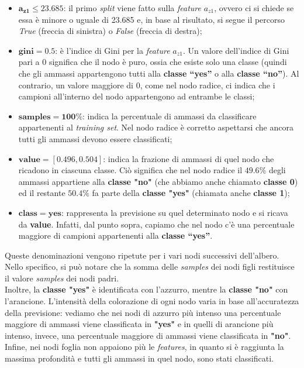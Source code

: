 \begin{itemize}
    \item $\mathbf{a_{z1} \le 23.685}$: il primo \textit{split} viene fatto sulla \textit{feature} $a_{z1}$, ovvero ci si chiede se essa è minore o uguale di 23.685 e, in base al risultato, si segue il percorso \textit{True} (freccia di sinistra) o \textit{False} (freccia di destra);
    \item $\mathbf{gini = 0.5}$: è l'indice di Gini per la \textit{feature} $a_{z1}$. Un valore dell'indice di Gini pari a 0 significa che il nodo è puro, ossia che esiste solo una classe (quindi che gli ammassi appartengono tutti alla \textbf{classe “yes”} o alla \textbf{classe “no”}). Al contrario, un valore maggiore di 0, come nel nodo radice, ci indica che i campioni all’interno del nodo appartengono ad entrambe le classi; 
    \item $\mathbf{samples = 100\%}$: indica la percentuale di ammassi da classificare appartenenti al \textit{training set}. Nel nodo radice è corretto aspettarsi che ancora tutti gli ammassi devono essere classificati;
    \item $\mathbf{value = [0.496, 0.504]}$: indica la frazione di ammassi di quel nodo che ricadono in ciascuna classe. Ciò significa che nel nodo radice il $49.6\%$ degli ammassi appartiene alla \textbf{classe "no"} (che abbiamo anche chiamato \textbf{classe 0}) ed il restante $50.4\%$ fa parte della \textbf{classe "yes"} (chiamata anche \textbf{classe 1});
    \item $\mathbf{class = yes}$: rappresenta la previsione su quel determinato nodo e si ricava da \textbf{value}. Infatti, dal punto sopra, capiamo che nel nodo c'è una percentuale maggiore di campioni appartenenti alla \textbf{classe “yes”}.
\end{itemize}
Queste denominazioni vengono ripetute per i vari nodi successivi dell’albero. Nello specifico, si può notare che la somma delle \textit{samples} dei nodi figli restituisce il valore \textit{samples} dei nodi padri.\\
Inoltre, la \textbf{classe "yes"} è identificata con l'azzurro, mentre la \textbf{classe "no"} con l'arancione. L'intensità della colorazione di ogni nodo varia in base all'accuratezza della previsione: vediamo che nei nodi di azzurro più intenso una percentuale maggiore di ammassi viene classificata in \textbf{"yes"} e in quelli di arancione più intenso, invece, una percentuale maggiore di ammassi viene classificata in \textbf{"no"}.\\
Infine, nei nodi foglia non appaiono più le \textit{features}, in quanto si è raggiunta la massima profondità e tutti gli ammassi in quel nodo, sono stati classificati.

